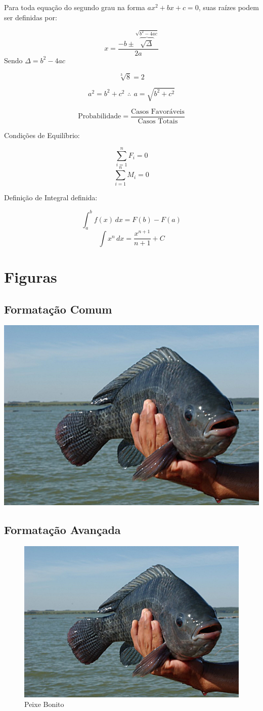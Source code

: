 \documentclass[12pt,a4paper]{article}
\begin{document}
Para toda equação do segundo grau na forma $ax^2 + bx + c= 0$, suas raízes podem ser definidas por:

$$ x = \dfrac{-b \pm \overbrace{\sqrt{\Delta}}^{\sqrt{b^2 - 4 a c}}}{2a} $$
Sendo $\Delta = b^2 - 4 a c$

$$\sqrt[3]{8}=2$$

$$a^2 = b^2 + c^2 \,\ \therefore \,\ a = \sqrt{b^2 + c^2}$$

$$\text{Probabilidade} = \dfrac{\text{Casos Favoráveis}}{\text{Casos Totais}}$$

Condições de Equilíbrio:

$$\sum_{i=1}^{n} F_i = 0$$
$$\sum_{i=1}^{n} M_i = 0$$

Definição de Integral definida:

$$\int_a^b f(x)\, dx = F(b) - F(a)$$
$$\int x^n \, dx= \dfrac{x^{n+1}}{n+1} + C$$

\section{Figuras}
\subsection{Formatação Comum}

\includegraphics[scale=.5]{peixe.jpg}

\subsection{Formatação Avançada}

\begin{figure}[!h]
\centering
\includegraphics[width=.5\textwidth]{peixe.jpg}
\caption{Peixe Bonito}
\label{fig:pb}
\end{figure}
\end{document}
